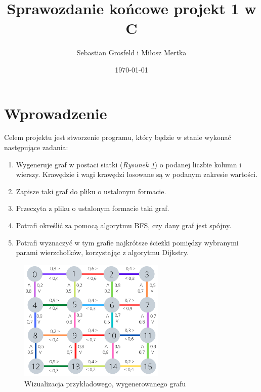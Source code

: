\documentclass{article}
\title{Sprawozdanie końcowe projekt 1 w C}
\author{Sebastian Grosfeld i Miłosz Mertka }
\date{\today}
\begin{document}
\maketitle

\tableofcontents

\newpage

\setlength{\headheight}{23pt}

\maketitle

\section{Wprowadzenie}
    Celem projektu jest stworzenie programu, który będzie w stanie wykonać następujące zadania:
\begin{enumerate}
    \item Wygeneruje graf w postaci siatki (\emph{Rysunek \ref{fig:wagi}}) o podanej liczbie kolumn i wierszy. Krawędzie i wagi krawędzi losowane są w podanym zakresie wartości.
    \item Zapisze taki graf do pliku o ustalonym formacie.
    \item Przeczyta z pliku o ustalonym formacie taki graf.
    \item Potrafi określić za pomocą algorytmu BFS, czy dany graf jest spójny.
    \item Potrafi wyznaczyć w tym grafie najkrótsze ścieżki pomiędzy wybranymi parami wierzchołków, korzystając z algorytmu Dijkstry.
\end{enumerate}
\begin{figure}[htp]
        \centering
        \includegraphics[width=7cm]{images/wagi.png}
        \caption{Wizualizacja przykładowego, wygenerowanego grafu}
        \label{fig:wagi}
\end{figure}
\end{document}
